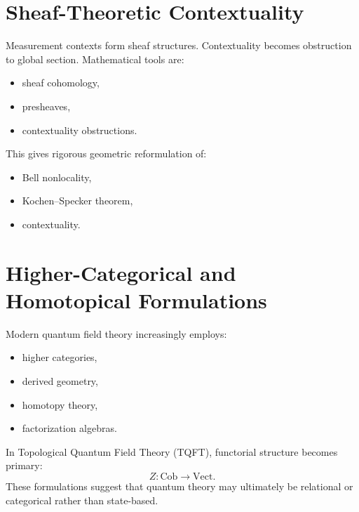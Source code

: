 \section{Sheaf-Theoretic Contextuality}
\label{qmf:st}
Measurement contexts form sheaf structures.
Contextuality becomes obstruction to global section.
Mathematical tools are:
\begin{itemize}
\item sheaf cohomology,
\item presheaves,
\item contextuality obstructions.
\end{itemize}
This gives rigorous geometric reformulation of:
\begin{itemize}
\item Bell nonlocality,
\item Kochen--Specker theorem,
\item contextuality.
\end{itemize}

\section{Higher-Categorical and Homotopical Formulations}
\label{qmf:hch}
Modern quantum field theory increasingly employs:
\begin{itemize}
\item higher categories,
\item derived geometry,
\item homotopy theory,
\item factorization algebras.
\end{itemize}
In Topological Quantum Field Theory (TQFT), functorial structure becomes primary:
\[Z:\mathrm{Cob}\rightarrow\mathrm{Vect}.\]
These formulations suggest that quantum theory may ultimately be relational
or categorical rather than state-based.


